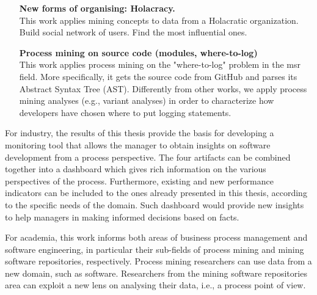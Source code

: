 \begin{enumerate}
	\item[\bfseries New forms of organising: Holacracy.]\\ 
	This work applies mining concepts to data from a Holacratic organization. Build social network of users. Find the most influential ones. 
	
	\item[\bfseries Process mining on source code (modules, where-to-log)]\\
	This work applies process mining on the "where-to-log" problem in the \gls{msr} field. More specifically, it gets the source code from GitHub and parses its Abstract Syntax Tree (AST). Differently from other works, we apply process mining analyses (e.g., variant analyses) in order to characterize how developers have chosen where to put logging statements. 
	
	
\end{enumerate}


For industry, the results of this thesis provide the basis for developing a monitoring tool that allows the manager to obtain insights on software development from a process perspective. The four artifacts can be combined together into a dashboard which gives rich information on the various perspectives of the process. Furthermore, existing and new performance indicators can be included to the ones already presented in this thesis, according to the specific needs of the domain. Such dashboard would provide new insights to help managers in making informed decisions based on facts. 

For academia, this work informs both areas of business process management and software engineering, in particular their sub-fields of process mining and mining software repositories, respectively. Process mining researchers can use data from a new domain, such as software. Researchers from the mining software repositories area can exploit a new lens on analysing their data, i.e., a process point of view. 

